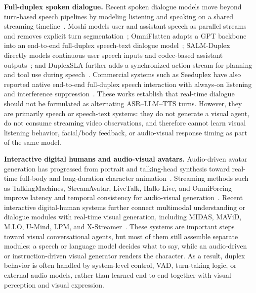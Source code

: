 \documentclass{llmxive}
\begin{document}
\textbf{Full-duplex spoken dialogue.}
Recent spoken dialogue models move beyond turn-based speech pipelines by modeling listening and speaking on a shared streaming timeline~\citep{chen2025fullduplexsurvey}. Moshi models user and assistant speech as parallel streams and removes explicit turn segmentation~\citep{defossez2024moshi}; OmniFlatten adapts a GPT backbone into an end-to-end full-duplex speech-text dialogue model~\citep{zhang2024omniflatten}; SALM-Duplex directly models continuous user speech inputs and codec-based assistant outputs~\citep{hu2025salmduplex}; and DuplexSLA further adds a synchronized action stream for planning and tool use during speech~\citep{zhang2026duplexsla}. Commercial systems such as Seeduplex have also reported native end-to-end full-duplex speech interaction with always-on listening and interference suppression~\citep{seeduplex2026}. These works establish that real-time dialogue should not be formulated as alternating ASR--LLM--TTS turns. However, they are primarily speech or speech-text systems: they do not generate a visual agent, do not consume streaming video observations, and therefore cannot learn visual listening behavior, facial/body feedback, or audio-visual response timing as part of the same model.

\textbf{Interactive digital humans and audio-visual avatars.}
Audio-driven avatar generation has progressed from portrait and talking-head synthesis toward real-time full-body and long-duration character animation~\citep{xu2024vasa,lin2025omnihuman1,ding2025kling-avatar}. Streaming methods such as TalkingMachines, StreamAvatar, LiveTalk, Hallo-Live, and OmniForcing improve latency and temporal consistency for audio-visual generation~\citep{talkingmachines2025,streamavatar2025,livetalk2025,hallolive2026,omniforcing2026}. Recent interactive digital-human systems further connect multimodal understanding or dialogue modules with real-time visual generation, including MIDAS, MAViD, M.I.O, U-Mind, LPM, and X-Streamer~\citep{chen2025midas,mavid2025,mio2025,deng2026umind,lpm2026,xstreamer2025}. These systems are important steps toward visual conversational agents, but most of them still assemble separate modules: a speech or language model decides what to say, while an audio-driven or instruction-driven visual generator renders the character. As a result, duplex behavior is often handled by system-level control, VAD, turn-taking logic, or external audio models, rather than learned end to end together with visual perception and visual expression.
\end{document}

